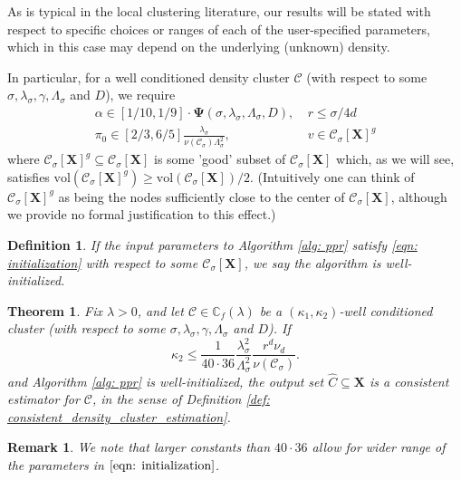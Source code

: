 \documentclass{article}
\newcommand{\vol}{\mathrm{vol}}
\newcommand{\1}{\mathbf{1}}
\newcommand{\Xbf}{\mathbf{X}}
\newcommand{\Cbb}{\mathbb{C}}
\newcommand{\Cset}{\mathcal{C}}
\newcommand{\Csig}{\Cset_{\sigma}}
\theoremstyle{aldenthm}
\newtheorem{theorem}{Theorem}
\newtheorem{definition}{Definition}
\theoremstyle{aldenrmrk}
\newtheorem{remark}{Remark}
\begin{document}
As is typical in the local clustering literature, our results will be stated with respect to specific choices or ranges of each of the user-specified parameters, which in this case may depend on the underlying (unknown) density. 

In particular, for a well conditioned density cluster $\Cset$ (with respect to some $\sigma, \lambda_{\sigma}, \gamma, \Lambda_{\sigma}$ and $D$), we require
\begin{align}
\label{eqn: initialization}
\alpha \in [1/10, 1/9] \cdot \mathbf{\Psi}(\sigma, \lambda_{\sigma}, \Lambda_{\sigma}, D), & ~r \leq \sigma/4d  \nonumber \\
\pi_0 \in [2/3, 6/5] \frac{\lambda_{\sigma}}{\nu(\Csig) \Lambda_{\sigma}^2}, & ~v \in \Csig[\Xbf]^g
\end{align}
where $\Csig[\Xbf]^g \subseteq \Csig[\Xbf]$ is some 'good' subset of $\Csig[\Xbf]$ which, as we will see, satisfies $\vol(\Csig[\Xbf]^g) \geq \vol(\Csig[\Xbf])/2$. (Intuitively one can think of $\Csig[\Xbf]^g$ as being the nodes sufficiently close to the center of $\Csig[\Xbf]$, although we provide no formal justification to this effect.)

\begin{definition}
	If the input parameters to Algorithm \ref{alg: ppr} satisfy \ref{eqn: initialization} with respect to some $\Csig[\Xbf]$, we say the algorithm is  \emph{well-initialized}.
\end{definition}

\begin{theorem}
	\label{thm: consistent_recovery_of_density_clusters}
	Fix $\lambda > 0$, and let $\Cset \in \Cbb_f(\lambda)$ be a $(\kappa_1,\kappa_2)$-well conditioned cluster (with respect to some $\sigma, \lambda_{\sigma}, \gamma, \Lambda_{\sigma}$ and $D$). If
	\begin{equation}
	\label{eqn: kappa2_ub}
	\kappa_2 \leq \frac{1}{40 \cdot 36} \frac{\lambda_{\sigma}^2}{\Lambda_{\sigma}^2} \frac{r^d \nu_d}{\nu(\Csig)}.
	\end{equation}
	and Algorithm \ref{alg: ppr} is well-initialized, the output set $\widehat{C} \subseteq \Xbf$ is a consistent estimator for $\Cset$, in the sense of Definition \ref{def: consistent_density_cluster_estimation}.
\end{theorem}

\begin{remark}
	We note that larger constants than $40 \cdot 36$ allow for wider range of the parameters in $\eqref{eqn: initialization}$. 
\end{remark}
\end{document}
